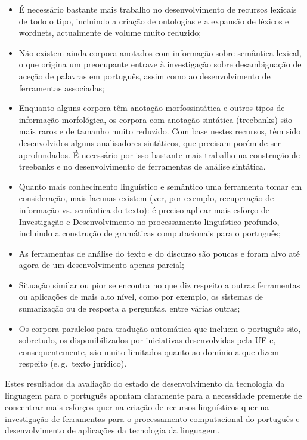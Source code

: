 \begin{multicols}{2}
\begin{itemize}
   \item É necessário bastante mais trabalho no desenvolvimento de recursos lexicais de todo o tipo, 
incluindo a criação de ontologias e a expansão de léxicos e wordnets, actualmente de volume muito reduzido;

   \item Não existem ainda corpora anotados com informação sobre semântica lexical, o que origina um preocupante 
entrave à investigação sobre desambiguação de aceção de palavras em português, assim como
ao desenvolvimento de ferramentas associadas; 

   \item Enquanto alguns corpora têm anotação morfossintática e outros tipos de informação morfológica, 
os corpora com anotação sintática (treebanks) são mais raros e de tamanho muito reduzido. 
Com base nestes recursos, têm sido desenvolvidos alguns analisadores sintáticos, que precisam 
porém de ser aprofundados. É necessário por isso bastante mais trabalho na construção de treebanks
e no desenvolvimento de ferramentas de análise sintática.

   \item Quanto mais conhecimento linguístico e semântico uma ferramenta tomar em consideração, 
mais lacunas existem (ver, por exemplo, recuperação de informação vs. semântica do texto):
 é preciso aplicar mais esforço de Investigação e Desenvolvimento no processamento
linguístico profundo, incluindo a construção de gramáticas computacionais para o português;

   \item As ferramentas de análise do texto e do discurso são poucas e foram alvo até agora de um desenvolvimento apenas parcial;

\item Situação similar ou pior se encontra no que diz respeito a outras
ferramentas ou aplicações de mais alto nível, como por exemplo, os sistemas de sumarização ou de resposta a perguntas, 
entre várias outras;

   \item Os corpora paralelos para tradução automática que incluem o português são, sobretudo, 
os disponibilizados por iniciativas desenvolvidas pela UE e, consequentemente, são muito limitados quanto ao domínio
a que dizem respeito (e.\,g.~texto jurídico).


\end{itemize}

Estes resultados da avaliação do estado de desenvolvimento da tecnologia da linguagem para o português
apontam claramente para a necessidade premente de concentrar mais esforços quer na criação de recursos 
linguísticos quer na investigação de ferramentas 
para o processamento computacional do português e desenvolvimento de aplicações da tecnologia da linguagem. 


\end{multicols}
